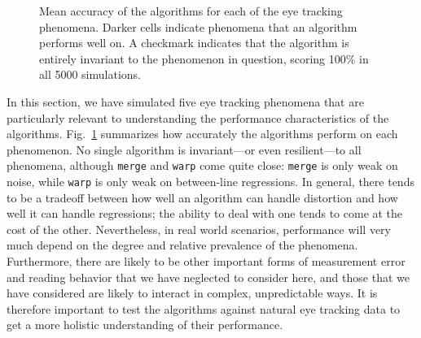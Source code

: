 \documentclass[doc,biblatex]{apa7}
\begin{document}
	\begin{figure}
	\vspace*{2pt}
	\caption{Mean accuracy of the algorithms for each of the eye tracking phenomena. Darker cells indicate phenomena that an algorithm performs well on. A checkmark indicates that the algorithm is entirely invariant to the phenomenon in question, scoring 100\% in all 5000 simulations.}
	\label{fig05}
	\end{figure}

In this section, we have simulated five eye tracking phenomena that are particularly relevant to understanding the performance characteristics of the algorithms. Fig.~\ref{fig05} summarizes how accurately the algorithms perform on each phenomenon. No single algorithm is invariant---or even resilient---to all phenomena, although \texttt{merge} and \texttt{warp} come quite close: \texttt{merge} is only weak on noise, while \texttt{warp} is only weak on between-line regressions. In general, there tends to be a tradeoff between how well an algorithm can handle distortion and how well it can handle regressions; the ability to deal with one tends to come at the cost of the other. Nevertheless, in real world scenarios, performance will very much depend on the degree and relative prevalence of the phenomena. Furthermore, there are likely to be other important forms of measurement error and reading behavior that we have neglected to consider here, and those that we have considered are likely to interact in complex, unpredictable ways. It is therefore important to test the algorithms against natural eye tracking data to get a more holistic understanding of their performance.

\end{document}
